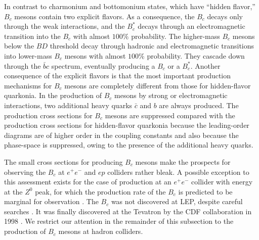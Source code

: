 In contrast to charmonium
and bottomonium states, which have ``hidden flavor,'' $B_c$ mesons
contain two explicit flavors. As a consequence, the $B_c$ decays only
through the weak interactions, and the $B_c^*$ decays through an
electromagnetic transition into the $B_c$ with almost $100\%$
probability. The higher-mass $B_c$ mesons below the $B D$ threshold
decay through hadronic and electromagnetic transitions into lower-mass
$B_c$ mesons with almost $100\%$ probability. They cascade down through
the $\bar b c$ spectrum, eventually producing a $B_c$ or a $B_c^*$.
Another consequence of the explicit flavors is that the most important
production mechanisms for $B_c$ mesons are completely different from
those for hidden-flavor quarkonia. In the production of $B_c$ mesons by
strong or electromagnetic interactions, two additional heavy quarks
$\bar{c}$ and $b$ are always produced. The production cross sections for
$B_c$ mesons are suppressed compared with the production cross sections
for hidden-flavor quarkonia because the leading-order diagrams are of
higher order in the coupling constants and also because the phase-space
is suppressed, owing to the presence of the additional heavy quarks.

The small cross sections for producing $B_c$ mesons make the
prospects for observing the $B_c$ at $e^+e^-$ and $ep$ colliders rather
bleak. A possible exception to this assessment exists for the case of
production at an $e^+e^-$ collider with energy at the $Z^0$ peak,
for which the production rate of the $B_c$ is predicted to be
marginal for observation \cite{Chang:bb}. The $B_c$ was not
discovered at LEP, despite careful searches
\cite{Abreu:1996nz,Barate:1997kk,Ackerstaff:1998zf}. It was finally
discovered at the Tevatron by the CDF collaboration in 1998
\cite{Abe:1998wi,Abe:1998fb}. We restrict our attention in the remainder
of this subsection to the production of $B_c$ mesons at hadron colliders.

